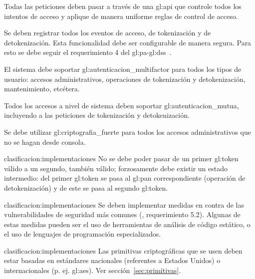 {
  Todas las peticiones deben pasar a través de una \gls{gl:api} que controle
  todos los intentos de acceso y aplique de manera uniforme reglas de
  control de acceso.
}

{
  Se deben registrar todos los eventos de acceso, de tokenización y
  de detokenización. Esta funcionalidad debe ser configurable de manera
  segura. Para esto se debe seguir el requerimiento 4 del
  \gls{gl:pa}-\gls{gl:dss}~\cite{dss_pa}.
}

{
  El sistema debe soportar \gls{gl:autenticacion_multifactor} para todos
  los tipos de usuario: accesos administrativos, operaciones de tokenización
  y detokenización, mantenimiento, etcétera.
}

{
  Todos los accesos a nivel de sistema deben soportar
  \gls{gl:autenticacion_mutua}, incluyendo a las peticiones de tokenización
  y detokenización.
}

{
  Se debe utilizar \gls{gl:criptografia_fuerte} para todos los accesos
  administrativos que no se hagan desde consola.
}

{clasificacion:implementaciones}
{
  No se debe poder pasar de un primer \gls{gl:token} válido a un segundo,
  también válido; forzosamente debe existir un estado intermedio: del primer
  \gls{gl:token} se pasa al \gls{gl:pan} correspondiente (operación de
  detokenización) y de este se pasa al segundo \gls{gl:token}.
}

{clasificacion:implementaciones}
{
  Se deben implementar medidas en contra de las vulnerabilidades de
  seguridad más comunes (\cite{dss_pa}, requerimiento 5.2). Algunas de estas
  medidas pueden ser el uso de herramientas de análisis de código estático,
  o el uso de lenguajes de programación especializados.
}

{clasificacion:implementaciones}
{
  Las primitivas criptográficas que se usen deben estar basadas en
  estándares nacionales (referentes a Estados Unidos) o internacionales (p. ej.
  \gls{gl:aes}). Ver sección~\ref{sec:primitivas}.
}

